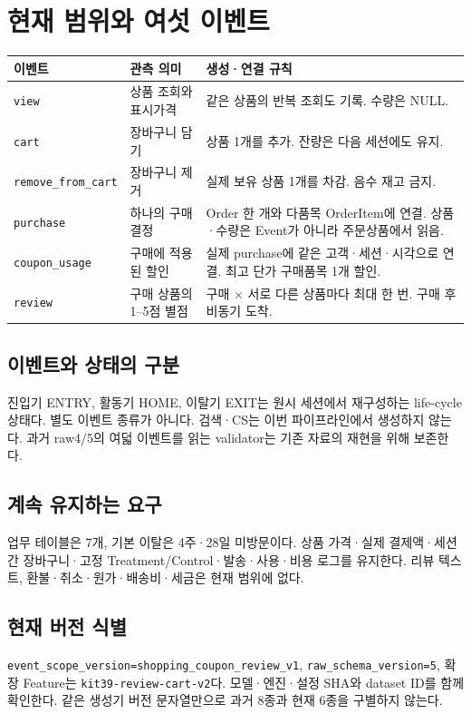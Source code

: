 \documentclass[11pt,a4paper]{article}
\newcommand{\code}[1]{{\ttfamily\footnotesize\nolinkurl{#1}}}
\newcommand{\thead}{\rowcolor{pale}}
\begin{document}
\section{현재 범위와 여섯 이벤트}
\begin{tabularx}{\linewidth}{@{}P{.19\linewidth}P{.24\linewidth}Y@{}}
\thead 이벤트 & 관측 의미 & 생성·연결 규칙\\\midrule
\code{view} & 상품 조회와 표시가격 & 같은 상품의 반복 조회도 기록. 수량은 NULL.\\[4pt]
\code{cart} & 장바구니 담기 & 상품 1개를 추가. 잔량은 다음 세션에도 유지.\\[4pt]
\code{remove_from_cart} & 장바구니 제거 & 실제 보유 상품 1개를 차감. 음수 재고 금지.\\[4pt]
\code{purchase} & 하나의 구매 결정 & Order 한 개와 다품목 OrderItem에 연결. 상품·수량은 Event가 아니라 주문상품에서 읽음.\\[4pt]
\code{coupon_usage} & 구매에 적용된 할인 & 실제 purchase에 같은 고객·세션·시각으로 연결. 최고 단가 구매품목 1개 할인.\\[4pt]
\code{review} & 구매 상품의 1--5점 별점 & 구매 $\times$ 서로 다른 상품마다 최대 한 번. 구매 후 비동기 도착.\\\bottomrule
\end{tabularx}

\subsection{이벤트와 상태의 구분}
진입기 ENTRY, 활동기 HOME, 이탈기 EXIT는 원시 세션에서 재구성하는 life-cycle 상태다. 별도 이벤트 종류가 아니다. 검색·CS는 이번 파이프라인에서 생성하지 않는다. 과거 raw4/5의 여덟 이벤트를 읽는 validator는 기존 자료의 재현을 위해 보존한다.

\subsection{계속 유지하는 요구}
업무 테이블은 7개, 기본 이탈은 4주·28일 미방문이다. 상품 가격·실제 결제액·세션 간 장바구니·고정 Treatment/Control·발송·사용·비용 로그를 유지한다. 리뷰 텍스트, 환불·취소·원가·배송비·세금은 현재 범위에 없다.

\subsection{현재 버전 식별}
\code{event_scope_version=shopping_coupon_review_v1}, \code{raw_schema_version=5}, 확장 Feature는 \code{kit39-review-cart-v2}다. 모델·엔진·설정 SHA와 dataset ID를 함께 확인한다. 같은 생성기 버전 문자열만으로 과거 8종과 현재 6종을 구별하지 않는다.
\end{document}
